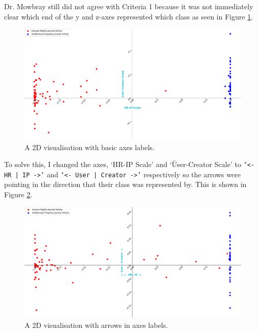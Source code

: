 			Dr. Mowbray still did not agree with Criteria 1 because it was not immediately clear which end of the y and z-axes represented which class as seen in Figure \ref{fig:2d-label}. 
			\begin{figure}
    			\centering
    			\includegraphics[width=0.9\linewidth]{resources/images/2d_label.png}
    			\caption{A 2D visualisation with basic axes labels.}
    			\label{fig:2d-label}
			\end{figure}

			To solve this, I changed the axes, `HR-IP Scale' and `Ùser-Creator Scale' to \texttt{`<- HR | IP ->'} and \texttt{`<- User | Creator ->'} respectively so the arrows were pointing in the direction that their class was represented by. This is shown in Figure \ref{fig:2d-arrow}. 
			\begin{figure}
    			\centering
    			\includegraphics[width=0.9\linewidth]{resources/images/2d_arrow.png}
    			\caption{A 2D visualisation with arrows in axes labels.}
    			\label{fig:2d-arrow}
			\end{figure}	
						
